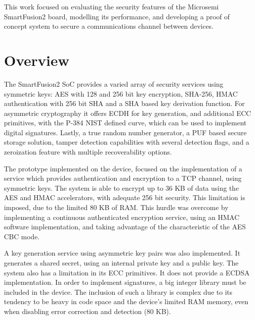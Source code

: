 \cleardoublepage
\label{chap:conclusion}

This work focused on evaluating the security features of the Microsemi SmartFusion2 board, modelling its performance, and developing a proof of concept system to secure a communications channel between devices.

\section{Overview} \label{chap:conclusion:overview}

The SmartFusion2 SoC provides a varied array of security services using symmetric keys: AES with 128 and 256 bit key encryption, SHA-256, HMAC authentication with 256 bit SHA and a SHA based key derivation function. For asymmetric cryptography it offers ECDH for key generation, and additional ECC primitives, with the P-384 NIST defined curve, which can be used to implement digital signatures. Lastly, a true random number generator, a PUF based secure storage solution, tamper detection capabilities with several detection flags, and a zeroization feature with multiple recoverability options.

The prototype implemented on the device, focused on the implementation of a service which provides authentication and encryption to a TCP channel, using symmetric keys. The system is able to encrypt up to 36 KB of data using the AES and HMAC accelerators, with adequate 256 bit security. This limitation is imposed, due to the limited 80 KB of RAM.
This hurdle was overcome by implementing a continuous authenticated encryption service, using an HMAC software implementation, and taking advantage of the characteristic of the AES CBC mode.

A key generation service using asymmetric key pairs was also implemented. It generates a shared secret, using an internal private key and a public key.
The system also has a limitation in its ECC primitives. It does not provide a ECDSA implementation. In order to implement signatures, a big integer library must be included in the device. The inclusion of such a library is complex due to its tendency to be heavy in code space and the device's limited RAM memory, even when disabling error correction and detection (80 KB). 


